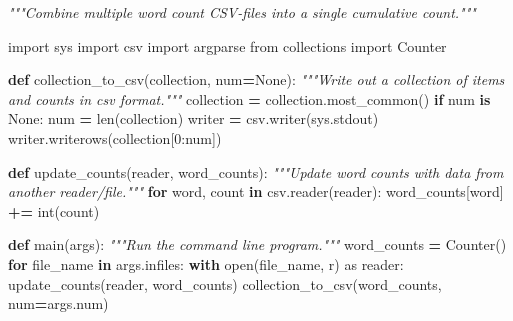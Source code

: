 \documentclass[
]{krantz}
\makeatletter
\newenvironment{Shaded}{\begin{snugshade}}{\end{snugshade}}
\newcommand{\BuiltInTok}[1]{#1}
\newcommand{\CommentTok}[1]{\textcolor[rgb]{0.56,0.35,0.01}{\textit{#1}}}
\newcommand{\ControlFlowTok}[1]{\textcolor[rgb]{0.13,0.29,0.53}{\textbf{#1}}}
\newcommand{\DecValTok}[1]{\textcolor[rgb]{0.00,0.00,0.81}{#1}}
\newcommand{\ImportTok}[1]{#1}
\newcommand{\KeywordTok}[1]{\textcolor[rgb]{0.13,0.29,0.53}{\textbf{#1}}}
\newcommand{\NormalTok}[1]{#1}
\newcommand{\OperatorTok}[1]{\textcolor[rgb]{0.81,0.36,0.00}{\textbf{#1}}}
\newcommand{\StringTok}[1]{\textcolor[rgb]{0.31,0.60,0.02}{#1}}
\newcommand{\VariableTok}[1]{\textcolor[rgb]{0.00,0.00,0.00}{#1}}
\newenvironment{kframe}{%
\medskip{}
\setlength{\fboxsep}{.8em}
 \def\at@end@of@kframe{}%
 \ifinner\ifhmode%
  \def\at@end@of@kframe{\end{minipage}}%
  \begin{minipage}{\columnwidth}%
 \fi\fi%
 \def\FrameCommand##1{\hskip\@totalleftmargin \hskip-\fboxsep
 \colorbox{shadecolor}{##1}\hskip-\fboxsep
     \hskip-\linewidth \hskip-\@totalleftmargin \hskip\columnwidth}%
 \MakeFramed {\advance\hsize-\width
   \@totalleftmargin\z@ \linewidth\hsize
   \@setminipage}}%
 {\par\unskip\endMakeFramed%
 \at@end@of@kframe}
\renewenvironment{Shaded}{\begin{kframe}}{\end{kframe}}
\makeatother
\begin{document}
\begin{Shaded}
\begin{Highlighting}[]
\CommentTok{"""Combine multiple word count CSV{-}files into a single cumulative count."""}

\ImportTok{import}\NormalTok{ sys}
\ImportTok{import}\NormalTok{ csv}
\ImportTok{import}\NormalTok{ argparse}
\ImportTok{from}\NormalTok{ collections }\ImportTok{import}\NormalTok{ Counter}


\KeywordTok{def}\NormalTok{ collection\_to\_csv(collection, num}\OperatorTok{=}\VariableTok{None}\NormalTok{):}
    \CommentTok{"""Write out a collection of items and counts in csv format."""}
\NormalTok{    collection }\OperatorTok{=}\NormalTok{ collection.most\_common()}
    \ControlFlowTok{if}\NormalTok{ num }\KeywordTok{is} \VariableTok{None}\NormalTok{:}
\NormalTok{        num }\OperatorTok{=} \BuiltInTok{len}\NormalTok{(collection)}
\NormalTok{    writer }\OperatorTok{=}\NormalTok{ csv.writer(sys.stdout)}
\NormalTok{    writer.writerows(collection[}\DecValTok{0}\NormalTok{:num])}


\KeywordTok{def}\NormalTok{ update\_counts(reader, word\_counts):}
    \CommentTok{"""Update word counts with data from another reader/file."""}
    \ControlFlowTok{for}\NormalTok{ word, count }\KeywordTok{in}\NormalTok{ csv.reader(reader):}
\NormalTok{        word\_counts[word] }\OperatorTok{+=} \BuiltInTok{int}\NormalTok{(count)}


\KeywordTok{def}\NormalTok{ main(args):}
    \CommentTok{"""Run the command line program."""}
\NormalTok{    word\_counts }\OperatorTok{=}\NormalTok{ Counter()}
    \ControlFlowTok{for}\NormalTok{ file\_name }\KeywordTok{in}\NormalTok{ args.infiles:}
        \ControlFlowTok{with} \BuiltInTok{open}\NormalTok{(file\_name, }\StringTok{\textquotesingle{}r\textquotesingle{}}\NormalTok{) }\ImportTok{as}\NormalTok{ reader:}
\NormalTok{            update\_counts(reader, word\_counts)}
\NormalTok{    collection\_to\_csv(word\_counts, num}\OperatorTok{=}\NormalTok{args.num)}



\end{Highlighting}
\end{Shaded}
\end{document}
